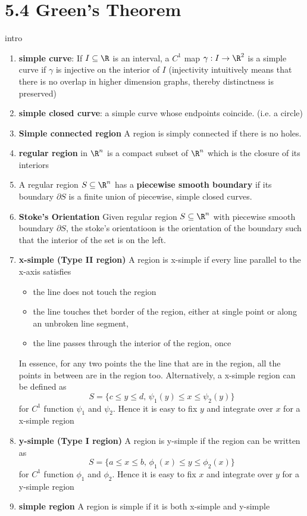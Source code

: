 \documentclass[11pt]{article}
\begin{document}
\section*{5.4 Green's Theorem}

\begin{defn*} intro
  \begin{enumerate}
    \item \textbf{simple curve}: If $I \subseteq \R$ is an interval, a $C^1$ map $\gamma: I \to\R^2$ is a simple curve if $\gamma$ is injective on the interior of $I$ (injectivity intuitively means that there is no overlap in higher dimension graphs, thereby distinctness is preserved)
    \item \textbf{simple closed curve}: a simple curve whose endpoints coincide. (i.e. a circle)
    \item \textbf{Simple connected region} A region is simply connected if there is no holes.
    \item \textbf{regular region} in $\R^n$ is a compact subset of $\R^n$ which is the closure of its interiors
    \item A regular region $S\subseteq\R^n$ has a \textbf{piecewise smooth boundary} if its boundary $\partial S$ is a finite union of piecewise, simple closed curves.
    \item \textbf{Stoke's Orientation} Given regular region $S\subseteq\R^n$ with piecewise smooth boundary $\partial S$, the stoke's orientatioon is the orientation of the boundary such that the interior of the set is on the left.
    \item \textbf{x-simple (Type II region)} A region is x-simple if every line parallel to the x-axis satisfies
    \begin{itemize}
      \item the line does not touch the region
      \item the line touches thet border of the region, either at single point or along an unbroken line segment,
      \item the line passes through the interior of the region, once
    \end{itemize}
    In essence, for any two points the the line that are in the region, all the points in between are in the region too. Alternatively, a x-simple region can be defined as
    \[
      S = \{ c\leq y \leq d, \, \psi_1(y) \leq x \leq \psi_2(y) \}
    \]
    for $C^1$ function $\psi_1$ and $\psi_2$. Hence it is easy to fix $y$ and integrate over $x$ for a x-simple region
    \item \textbf{y-simple (Type I region)} A region is y-simple if the region can be written as
    \[
      S = \{ a\leq x \leq b, \, \phi_1(x) \leq y \leq \phi_2(x) \}
    \]
    for $C^1$ function $\phi_1$ and $\phi_2$. Hence it is easy to fix $x$ and integrate over $y$ for a y-simple region
    \item \textbf{simple region} A region is simple if it is both x-simple and y-simple
  \end{enumerate}

\end{defn*}
\end{document}
